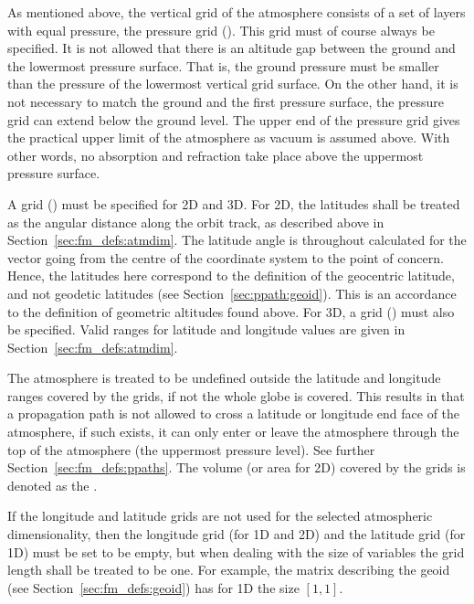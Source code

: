 \label{sec:fm_defs:grids}

As mentioned above, the vertical grid of the atmosphere consists of a
set of layers with equal pressure, the pressure grid
().  This grid must of course always be specified.
It is not allowed that there is an altitude gap between the ground and
the lowermost pressure surface.  That is, the ground pressure must be
smaller than the pressure of the lowermost vertical grid surface. On
the other hand, it is not necessary to match the ground and the first
pressure surface, the pressure grid can extend below the ground level.
The upper end of the pressure grid gives the practical upper limit of
the atmosphere as vacuum is assumed above. With other words, no
absorption and refraction take place above the uppermost pressure
surface.

A  grid () must be specified
for 2D and 3D.  For 2D, the latitudes shall be treated as the angular
distance along the orbit track, as described above in
Section~\ref{sec:fm_defs:atmdim}.  The latitude angle is throughout
calculated for the vector going from the centre of the coordinate
system to the point of concern. Hence, the latitudes here correspond
to the definition of the geocentric latitude, and not geodetic
latitudes (see Section~\ref{sec:ppath:geoid}). This is an accordance
to the definition of geometric altitudes found above.  For 3D, a
 grid () must also be specified.
Valid ranges for latitude and longitude values are given in
Section~\ref{sec:fm_defs:atmdim}.

The atmosphere is treated to be undefined outside the latitude and
longitude ranges covered by the grids, if not the whole globe is
covered. This results in that a propagation path is not allowed to
cross a latitude or longitude end face of the atmosphere, if such
exists, it can only enter or leave the atmosphere through the top of
the atmosphere (the uppermost pressure level). See further
Section~\ref{sec:fm_defs:ppaths}. The volume (or area for 2D) covered
by the grids is denoted as the .

If the longitude and latitude grids are not used for the selected
atmospheric dimensionality, then the longitude grid (for 1D and 2D)
and the latitude grid (for 1D) must be set to be empty, but when
dealing with the size of variables the grid length shall be treated to
be one. For example, the matrix describing the geoid (see
Section~\ref{sec:fm_defs:geoid}) has for 1D the size $[1,1]$.


